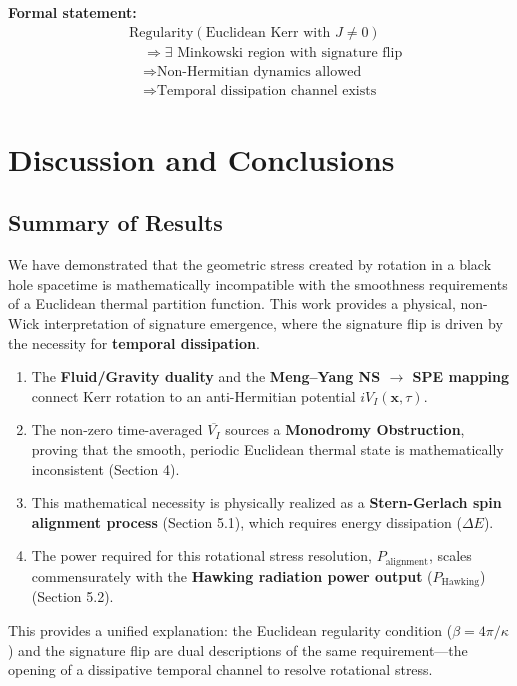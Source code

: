\documentclass[11pt]{article}
\begin{document}
\textbf{Formal statement:}
\begin{equation}
\boxed{
\begin{aligned}
&\text{Regularity}(\text{Euclidean Kerr with } J \neq 0) \\
&\quad \Rightarrow \exists \text{ Minkowski region with signature flip} \\
&\quad \Rightarrow \text{Non-Hermitian dynamics allowed} \\
&\quad \Rightarrow \text{Temporal dissipation channel exists}
\end{aligned}
}
\end{equation}

\section{Discussion and Conclusions}

\subsection{Summary of Results}

We have demonstrated that the geometric stress created by rotation in a black hole spacetime is mathematically incompatible with the smoothness requirements of a Euclidean thermal partition function. This work provides a physical, non-Wick interpretation of signature emergence, where the signature flip is driven by the necessity for \textbf{temporal dissipation}.
\begin{enumerate}
\item The \textbf{Fluid/Gravity duality} and the \textbf{Meng--Yang NS $\to$ SPE mapping} connect Kerr rotation to an anti-Hermitian potential $iV_I(\mathbf{x}, \tau)$.
\item The non-zero time-averaged $\overline{V_I}$ sources a \textbf{Monodromy Obstruction}, proving that the smooth, periodic Euclidean thermal state is mathematically inconsistent (Section 4).
\item This mathematical necessity is physically realized as a \textbf{Stern-Gerlach\cite{SternGerlach1922} spin alignment process} (Section 5.1), which requires energy dissipation ($\Delta E$).

\item The power required for this rotational stress resolution, $P_{\text{alignment}}$, scales commensurately with the \textbf{Hawking radiation\cite{Hawking1975} power output} ($P_{\text{Hawking}}$) (Section 5.2).
\end{enumerate}
This provides a unified explanation: the Euclidean regularity condition ($\beta = 4\pi/\kappa$) and the signature flip are dual descriptions of the same requirement—the opening of a dissipative temporal channel to resolve rotational stress.
\end{document}
